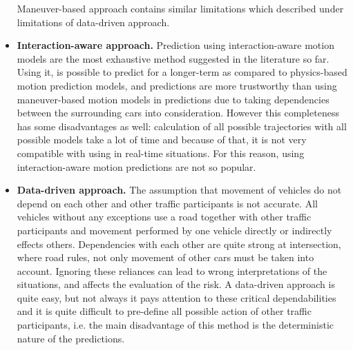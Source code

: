 \begin{itemize}
	Maneuver-based approach contains similar limitations which described under limitations of data-driven approach.
	
	\item \textbf{Interaction-aware approach.} Prediction using interaction-aware motion models are the most exhaustive method suggested in the literature so far. Using it, is possible to predict for a longer-term as compared to physics-based motion prediction models, and predictions are more trustworthy than using maneuver-based motion models in predictions due to taking dependencies between the surrounding cars into consideration. However this completeness has some disadvantages as well:  calculation of all possible trajectories with all possible models take a lot of time and because of that, it is not very compatible with using in real-time situations. For this reason, using interaction-aware motion predictions are not so popular. 
	
	\item \textbf{Data-driven approach.} The assumption that movement of vehicles do not depend on each other and other traffic participants is not accurate.  All vehicles without any exceptions use a road together with other traffic participants and movement performed by one vehicle directly or indirectly effects others. Dependencies with each other are quite strong at intersection, where road rules, not only movement of other cars must be taken into account. Ignoring these reliances can lead to wrong interpretations of the situations, and affects the evaluation of the risk. A data-driven approach is quite easy, but not always it pays attention to these critical dependabilities and it is quite difficult to pre-define all possible action of other traffic participants, i.e. the main disadvantage of this method is the deterministic nature of the predictions.
\end{itemize}